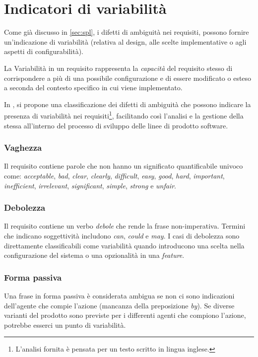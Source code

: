 \documentclass[12pt]{report}
\begin{document}
\section{Indicatori di variabilità}  %
\label{sec:indicatori}
Come già discusso in \cref{sec:spl}, i difetti di ambiguità nei requisiti, possono fornire un'indicazione di variabilità (relativa al design, alle scelte implementative o agli aspetti di configurabilità).

\begin{mdframed}
\small
La \textsf{Variabilità} in un requisito rappresenta la \textit{capacità} del requisito stesso di corrispondere a più di una possibile configurazione e di essere modificato o esteso a seconda del contesto specifico in cui viene implementato.
\end{mdframed}

In \cite{oai:it.cnr:prodotti:424687,oai:it.cnr:prodotti:474934,oai:it.cnr:prodotti:458001}, si propone una classificazione dei difetti di ambiguità che possono indicare la presenza di variabilità nei requisiti\footnote{L’analisi fornita è pensata per un testo scritto in lingua inglese.}, facilitando così l'analisi e la gestione della stessa all'interno del processo di sviluppo delle linee di prodotto software.


\subsubsection{\textsf{Vaghezza}}
Il requisito contiene parole che non hanno un significato quantificabile univoco come: \textit{acceptable}, \textit{bad}, \textit{clear}, \textit{clearly}, \textit{difficult}, \textit{easy}, \textit{good}, \textit{hard}, \textit{important}, \textit{inefficient}, \textit{irrelevant}, \textit{significant}, \textit{simple}, \textit{strong} e \textit{unfair}.


\subsubsection{\textsf{Debolezza}}
Il requisito contiene un verbo \textit{debole} che rende la frase non-imperativa. Termini che indicano soggettività includono \textit{can}, \textit{could} e \textit{may}. I casi di debolezza sono direttamente classificabili come variabilità quando introducono una scelta nella configurazione del sistema o una opzionalità in una \textit{feature}.


\subsubsection{\textsf{Forma passiva}}
Una frase in forma passiva è considerata ambigua se non ci sono indicazioni dell'agente che compie l'azione (mancanza della preposizione \textit{by}). Se diverse varianti del prodotto sono previste per i differenti agenti che compiono l'azione, potrebbe esserci un punto di variabilità.
\end{document}
